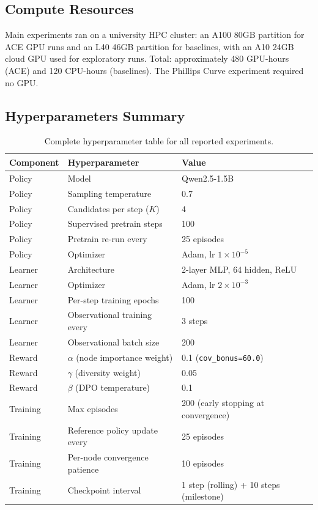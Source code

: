 \subsection{Compute Resources}

Main experiments ran on a university HPC cluster: an A100 80GB partition for ACE GPU runs and an L40 46GB partition for baselines, with an A10 24GB cloud GPU used for exploratory runs. Total: approximately 480 GPU-hours (ACE) and 120 CPU-hours (baselines). The Phillips Curve experiment required no GPU.

\subsection{Hyperparameters Summary}
\label{app:hyper-summary}

\begin{table}[h]
\centering
\caption{Complete hyperparameter table for all reported experiments.}
\label{tab:hyper-summary}
\small
\begin{tabular}{@{}lll@{}}
\toprule
Component & Hyperparameter & Value \\
\midrule
Policy & Model & Qwen2.5-1.5B \\
Policy & Sampling temperature & 0.7 \\
Policy & Candidates per step ($K$) & 4 \\
Policy & Supervised pretrain steps & 100 \\
Policy & Pretrain re-run every & 25 episodes \\
Policy & Optimizer & Adam, lr $1 \times 10^{-5}$ \\
\midrule
Learner & Architecture & 2-layer MLP, 64 hidden, ReLU \\
Learner & Optimizer & Adam, lr $2 \times 10^{-3}$ \\
Learner & Per-step training epochs & 100 \\
Learner & Observational training every & 3 steps \\
Learner & Observational batch size & 200 \\
\midrule
Reward & $\alpha$ (node importance weight) & 0.1 (\texttt{cov\_bonus=60.0}) \\
Reward & $\gamma$ (diversity weight) & 0.05 \\
Reward & $\beta$ (DPO temperature) & 0.1 \\
\midrule
Training & Max episodes & 200 (early stopping at convergence) \\
Training & Reference policy update every & 25 episodes \\
Training & Per-node convergence patience & 10 episodes \\
Training & Checkpoint interval & 1 step (rolling) + 10 steps (milestone) \\
\bottomrule
\end{tabular}
\end{table}

